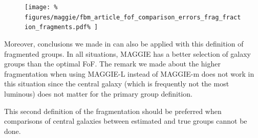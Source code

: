 \begin{figure}[htb]
    \centering
    \begin{minipage}{0.39\linewidth}
        \texttt{[image: \%
figures/maggie/fbm\_article\_fof\_comparison\_errors\_frag\_fraction\_fragments.pdf\%
        ]}
    \end{minipage}
    \begin{minipage}{0.59\linewidth}
        \centering
        \begin{minipage}{\linewidth}
        \end{minipage}
        \begin{minipage}{\linewidth}
        \end{minipage}
    \end{minipage}
\end{figure}

Moreover, conclusions we made in  can also be applied
with this definition of fragmented groups. In all situations, MAGGIE has a
better selection of galaxy groups than the optimal FoF. The remark we made
about the higher fragmentation when using MAGGIE-L instead of MAGGIE-m does not
work in this situation since the central galaxy (which is frequently not the
most luminous) does not matter for the primary group definition.

This second definition of the fragmentation should be preferred when
comparisons of central galaxies between estimated and true groups cannot be
done.

